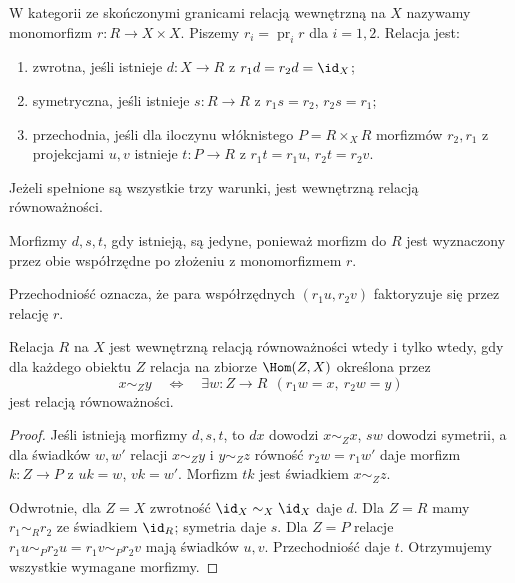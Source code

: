 \begin{definicja}\label{cat:def:barr-internal-relation}
W kategorii ze skończonymi granicami relacją wewnętrzną na $X$ nazywamy monomorfizm $r:R\to X\times X$. Piszemy $r_i=\operatorname{pr}_i r$ dla $i=1,2$. Relacja jest:
\begin{enumerate}
 \item zwrotna, jeśli istnieje $d:X\to R$ z $r_1d=r_2d=\id_X$;
 \item symetryczna, jeśli istnieje $s:R\to R$ z $r_1s=r_2$, $r_2s=r_1$;
 \item przechodnia, jeśli dla iloczynu włóknistego $P=R\times_X R$ morfizmów $r_2,r_1$ z projekcjami $u,v$ istnieje $t:P\to R$ z $r_1t=r_1u$, $r_2t=r_2v$.
\end{enumerate}
Jeżeli spełnione są wszystkie trzy warunki, jest wewnętrzną relacją równoważności.
\end{definicja}

Morfizmy $d,s,t$, gdy istnieją, są jedyne, ponieważ morfizm do $R$ jest wyznaczony przez obie współrzędne po złożeniu z monomorfizmem $r$.

\begin{center}
\end{center}
Przechodniość oznacza, że para współrzędnych $(r_1u,r_2v)$ faktoryzuje się przez relację $r$.

\begin{stwierdzenie}\label{cat:prop:barr-generalized-elements}
Relacja $R$ na $X$ jest wewnętrzną relacją równoważności wtedy i tylko wtedy, gdy dla każdego obiektu $Z$ relacja na zbiorze $\Hom(Z,X)$ określona przez
\[
 x\sim_Z y\quad\Longleftrightarrow\quad
 \exists w:Z\to R\ \ (r_1w=x,\ r_2w=y)
\]
jest relacją równoważności.
\end{stwierdzenie}
\begin{proof}
Jeśli istnieją morfizmy $d,s,t$, to $dx$ dowodzi $x\sim_Z x$, $sw$ dowodzi symetrii, a dla świadków $w,w'$ relacji $x\sim_Z y$ i $y\sim_Z z$ równość $r_2w=r_1w'$ daje morfizm $k:Z\to P$ z $uk=w$, $vk=w'$. Morfizm $tk$ jest świadkiem $x\sim_Z z$.

Odwrotnie, dla $Z=X$ zwrotność $\id_X\sim_X\id_X$ daje $d$. Dla $Z=R$ mamy $r_1\sim_R r_2$ ze świadkiem $\id_R$; symetria daje $s$. Dla $Z=P$ relacje $r_1u\sim_P r_2u=r_1v\sim_P r_2v$ mają świadków $u,v$. Przechodniość daje $t$. Otrzymujemy wszystkie wymagane morfizmy.
\end{proof}

